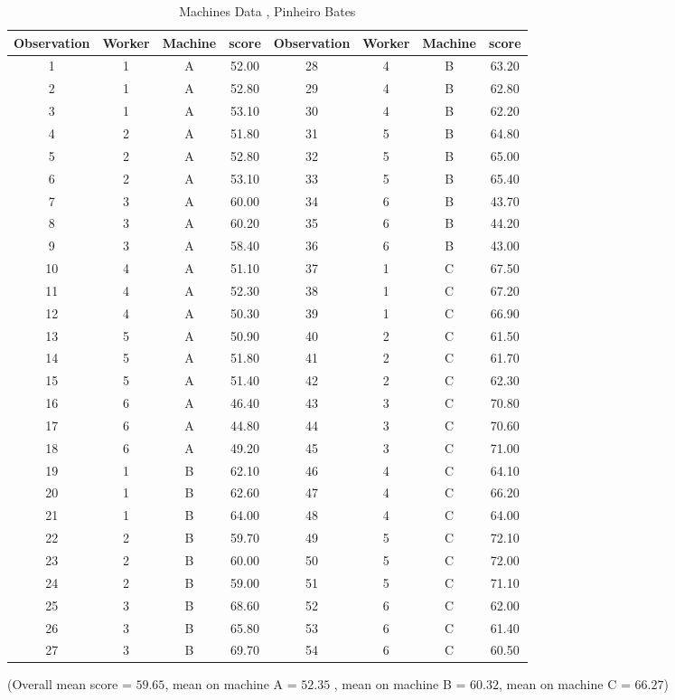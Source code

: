 \documentclass[12pt, a4paper]{report}
\begin{document}
\newpage
\begin{table}[h!]
\begin{center}
\begin{tabular}{|c|c|c|c||c|c|c|c|}
  \hline
Observation & Worker & Machine & score & Observation & Worker & Machine & score \\
  \hline
1 & 1 & A & 52.00 &	28 & 4 & B & 63.20 \\
  2 & 1 & A & 52.80 &	  29 & 4 & B & 62.80 \\
  3 & 1 & A & 53.10 &	  30 & 4 & B & 62.20 \\
  4 & 2 & A & 51.80 &	  31 & 5 & B & 64.80 \\
  5 & 2 & A & 52.80 &	  32 & 5 & B & 65.00 \\
  6 & 2 & A & 53.10 &	  33 & 5 & B & 65.40 \\
  7 & 3 & A & 60.00 &	  34 & 6 & B & 43.70 \\
  8 & 3 & A & 60.20 &	  35 & 6 & B & 44.20 \\
  9 & 3 & A & 58.40 &	  36 & 6 & B & 43.00 \\
  10 & 4 & A & 51.10 &	  37 & 1 & C & 67.50 \\
  11 & 4 & A & 52.30 &	  38 & 1 & C & 67.20 \\
  12 & 4 & A & 50.30 &	  39 & 1 & C & 66.90 \\
  13 & 5 & A & 50.90 &	  40 & 2 & C & 61.50 \\
  14 & 5 & A & 51.80 &	  41 & 2 & C & 61.70 \\
  15 & 5 & A & 51.40 &	  42 & 2 & C & 62.30 \\
  16 & 6 & A & 46.40 &	  43 & 3 & C & 70.80 \\
  17 & 6 & A & 44.80 &	  44 & 3 & C & 70.60 \\
  18 & 6 & A & 49.20 &	  45 & 3 & C & 71.00 \\
  19 & 1 & B & 62.10 &	  46 & 4 & C & 64.10 \\
  20 & 1 & B & 62.60 &	  47 & 4 & C & 66.20 \\
  21 & 1 & B & 64.00 &	  48 & 4 & C & 64.00 \\
  22 & 2 & B & 59.70 &	  49 & 5 & C & 72.10 \\
  23 & 2 & B & 60.00 &	  50 & 5 & C & 72.00 \\
  24 & 2 & B & 59.00 &	  51 & 5 & C & 71.10 \\
  25 & 3 & B & 68.60 &	  52 & 6 & C & 62.00 \\
  26 & 3 & B & 65.80 &	  53 & 6 & C & 61.40 \\
  27 & 3 & B & 69.70 &	  54 & 6 & C & 60.50 \\

   \hline
\end{tabular}
\caption{Machines Data , Pinheiro Bates}
\end{center}
\end{table}
(Overall mean score = $59.65$, mean on machine A = $52.35$ , mean
on machine B = $60.32$, mean on machine C = $66.27$)
\newpage
\end{document}
